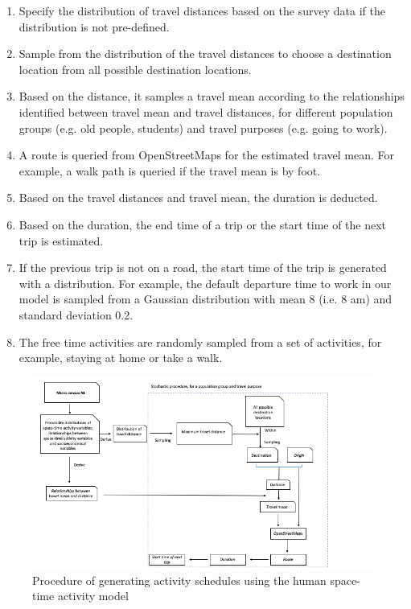 \documentclass[]{article}
\begin{document}
\begin{enumerate}
    \item Specify the distribution of travel distances based on the survey data if the distribution is not pre-defined. 
    \item Sample from the distribution of the travel distances to choose a destination location from all possible destination locations.
    \item Based on the distance, it samples a travel mean according to the relationships identified between travel mean and travel distances, for different population groups  (e.g. old people, students) and travel purposes (e.g. going to work).
    \item A route is queried from OpenStreetMaps for the estimated travel mean. For example, a walk path is queried if the travel mean is by foot.  
    \item Based on the travel distances and travel mean, the duration is deducted. 
    \item Based on the duration, the end time of a trip or the start time of the next trip is estimated. 
    \item If the previous trip is not on a road, the start time of the trip is generated with a distribution. For example, the default departure time to work in our model is sampled from a Gaussian distribution with mean 8 (i.e. 8 am) and standard deviation 0.2. 
    \item The free time activities are randomly sampled from a set of activities, for example, staying at home or take a walk. 
\end{enumerate}
  

\begin{figure}[h]
    \centering
    \includegraphics[width=\linewidth]{figure/detail.png}
    \caption{Procedure of generating activity schedules using the human space-time activity model}
    \label{fig:detail}
\end{figure}
\end{document}
